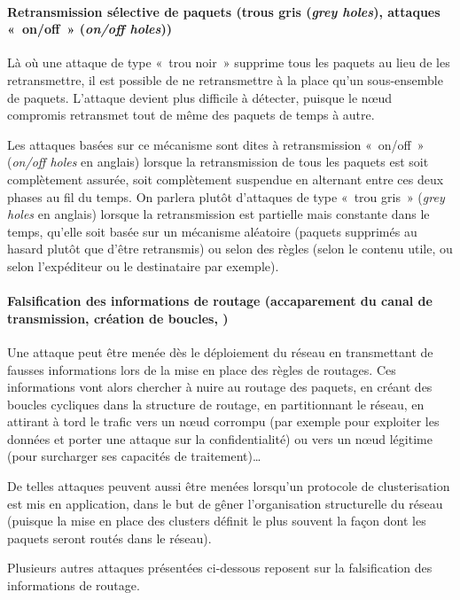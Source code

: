         \paragraph{Retransmission sélective de paquets (trous gris (\textit{grey holes}), attaques « on/off » (\textit{on/off holes}))}
Là où une attaque de type « trou noir » supprime tous les paquets au lieu de les retransmettre, il est possible de ne retransmettre à la place qu'un sous-ensemble de paquets.
L'attaque devient plus difficile à détecter, puisque le nœud compromis retransmet tout de même des paquets de temps à autre.

Les attaques basées sur ce mécanisme sont dites à retransmission « on/off » (\textit{on/off holes} en anglais) lorsque la retransmission de tous les paquets est soit complètement assurée, soit complètement suspendue en alternant entre ces deux phases au fil du temps.
On parlera plutôt d'attaques de type « trou gris » (\textit{grey holes} en anglais) lorsque la retransmission est partielle mais constante dans le temps, qu'elle soit basée sur un mécanisme aléatoire (paquets supprimés au hasard plutôt que d'être retransmis) ou selon des règles (selon le contenu utile, ou selon l'expéditeur ou le destinataire par exemple).

        \paragraph{Falsification des informations de routage (accaparement du canal de transmission, création de boucles, \etc)}
Une attaque peut être menée dès le déploiement du réseau en transmettant de fausses informations lors de la mise en place des règles de routages.
Ces informations vont alors chercher à nuire au routage des paquets, en créant des boucles cycliques dans la structure de routage, en partitionnant le réseau, en attirant à tord le trafic vers un nœud corrompu (par exemple pour exploiter les données et porter une attaque sur la confidentialité) ou vers un nœud légitime (pour surcharger ses capacités de traitement)\dots

De telles attaques peuvent aussi être menées lorsqu'un protocole de clusterisation est mis en application, dans le but de gêner l'organisation structurelle du réseau (puisque la mise en place des clusters définit le plus souvent la façon dont les paquets seront routés dans le réseau).

Plusieurs autres attaques présentées ci-dessous reposent sur la falsification des informations de routage.

